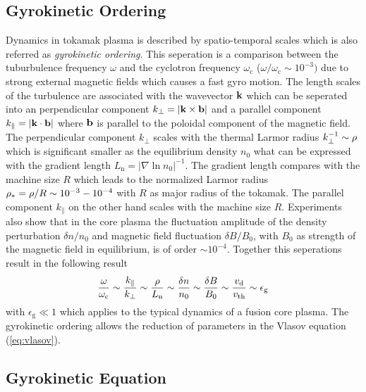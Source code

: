 \newpage

\subsection{Gyrokinetic Ordering}
\label{sub:gyroordering}

Dynamics in tokamak plasma is described by spatio-temporal scales which is also referred as \textit{gyrokinetic ordering}. This seperation is a comparison between the tuburbulence frequency $\omega$ and the cyclotron frequency $\omega_\mathrm{c}$ ($\omega/\omega_\mathrm{c} \sim 10^{-3})$ due to strong external magnetic fields which causes a fast gyro motion. The length scales of the turbulence are associated with the wavevector $\boldsymbol{\mathbf{k}}$ which can be seperated into an perpendicular component $k_\perp = |\boldsymbol{\mathbf{k}} \times \boldsymbol{\mathbf{b}}|$ and a parallel component $k_\parallel = |\boldsymbol{\mathbf{k}} \cdot \boldsymbol{\mathbf{b}}|$ where $\boldsymbol{\mathbf{b}}$ is parallel to the poloidal component of the magnetic field. The perpendicular component $k_\perp$ scales with the thermal Larmor radius $k_\perp^{-1} \sim \rho$ which is significant smaller as the equilibrium density $n_0$ what can be expressed with the gradient length $L_\mathrm{n} = |\nabla \ln n_0 |^{-1}$. The gradient length compares with the machine size $R$ which leads to the normalized Larmor radius $\rho_* = \rho/R \sim 10^{-3} - 10^{-4}$ with $R$ as major radius of the tokamak. The parallel component $k_\parallel$ on the other hand scales with the machine size $R$. Experiments also show that in the core plasma the fluctuation amplitude of the density perturbation $\delta n/n_0$ and magnetic field fluctuation $\delta B/B_0$, with $B_0$ as strength of the magnetic field in equilibrium, is of order $\sim 10^{-4}$. Together this seperations result in the following result
\begin{gather}
	\frac{\omega}{\omega_\mathrm{c}} \sim \frac{k_\parallel}{k_\perp} \sim \frac{\rho}{L_\mathrm{n}} \sim \frac{\delta n}{n_0} \sim \frac{\delta B}{B_0} \sim \frac{v_\mathrm{d}}{v_{\mathrm{th}}} \sim \epsilon_\mathrm{g}
	\label{eq:gyroordering}
\end{gather}
with $\epsilon_\mathrm{g} \ll 1$ which applies to the typical dynamics of a fusion core plasma. \cite{Brizard2007,Garbet2010} The gyrokinetic ordering allows the reduction of parameters in the Vlasov equation (\ref{eq:vlasov}).

\newpage

\subsection{Gyrokinetic Equation}
\label{sub:gyrokinetic}
 
